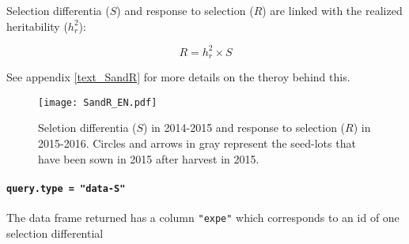 \documentclass{article}\usepackage[]{graphicx}\usepackage[]{color}
\begin{document}
Selection differentia ($S$) and response to selection ($R$) are linked with the realized heritability ($h_{r}^2$):

\begin{displaymath}
R = h_{r}^2 \times S
\end{displaymath}

See appendix \ref{text_SandR} for more details on the theroy behind this.

\begin{figure}[H]
\begin{center}
\texttt{[image: SandR\_EN.pdf]}
\caption{Seletion differentia ($S$) in 2014-2015 and response to selection ($R$) in 2015-2016. Circles and arrows in gray represent the seed-lots that have been sown in 2015 after harvest in 2015.}
\label{SandR}
\end{center}
\end{figure}



\paragraph{\texttt{query.type = "data-S"}}

The data frame returned has a column \texttt{"expe"} which corresponds to an id of one selection differential
\end{document}
